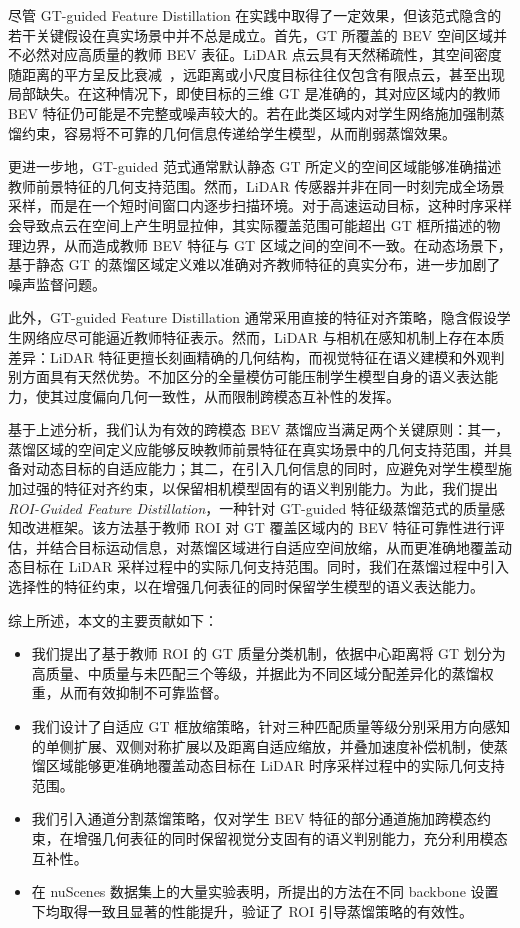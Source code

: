 \documentclass[12pt, UTF8]{ctexart}
\begin{document}
尽管 GT-guided Feature Distillation 在实践中取得了一定效果，但该范式隐含的若干关键假设在真实场景中并不总是成立。首先，GT 所覆盖的 BEV 空间区域并不必然对应高质量的教师 BEV 表征。LiDAR 点云具有天然稀疏性，其空间密度随距离的平方呈反比衰减~\cite{raanet,lidar_survey_2022}，远距离或小尺度目标往往仅包含有限点云，甚至出现局部缺失。在这种情况下，即使目标的三维 GT 是准确的，其对应区域内的教师 BEV 特征仍可能是不完整或噪声较大的。若在此类区域内对学生网络施加强制蒸馏约束，容易将不可靠的几何信息传递给学生模型，从而削弱蒸馏效果。

更进一步地，GT-guided 范式通常默认静态 GT 所定义的空间区域能够准确描述教师前景特征的几何支持范围。然而，LiDAR 传感器并非在同一时刻完成全场景采样，而是在一个短时间窗口内逐步扫描环境。对于高速运动目标，这种时序采样会导致点云在空间上产生明显拉伸，其实际覆盖范围可能超出 GT 框所描述的物理边界，从而造成教师 BEV 特征与 GT 区域之间的空间不一致。在动态场景下，基于静态 GT 的蒸馏区域定义难以准确对齐教师特征的真实分布，进一步加剧了噪声监督问题。

此外，GT-guided Feature Distillation 通常采用直接的特征对齐策略，隐含假设学生网络应尽可能逼近教师特征表示。然而，LiDAR 与相机在感知机制上存在本质差异：LiDAR 特征更擅长刻画精确的几何结构，而视觉特征在语义建模和外观判别方面具有天然优势。不加区分的全量模仿可能压制学生模型自身的语义表达能力，使其过度偏向几何一致性，从而限制跨模态互补性的发挥。

基于上述分析，我们认为有效的跨模态 BEV 蒸馏应当满足两个关键原则：其一，蒸馏区域的空间定义应能够反映教师前景特征在真实场景中的几何支持范围，并具备对动态目标的自适应能力；其二，在引入几何信息的同时，应避免对学生模型施加过强的特征对齐约束，以保留相机模型固有的语义判别能力。为此，我们提出 \emph{ROI-Guided Feature Distillation}，一种针对 GT-guided 特征级蒸馏范式的质量感知改进框架。该方法基于教师 ROI 对 GT 覆盖区域内的 BEV 特征可靠性进行评估，并结合目标运动信息，对蒸馏区域进行自适应空间放缩，从而更准确地覆盖动态目标在 LiDAR 采样过程中的实际几何支持范围。同时，我们在蒸馏过程中引入选择性的特征约束，以在增强几何表征的同时保留学生模型的语义表达能力。

综上所述，本文的主要贡献如下：
\begin{itemize}
    \item 我们提出了基于教师 ROI 的 GT 质量分类机制，依据中心距离将 GT 划分为高质量、中质量与未匹配三个等级，并据此为不同区域分配差异化的蒸馏权重，从而有效抑制不可靠监督。
    \item 我们设计了自适应 GT 框放缩策略，针对三种匹配质量等级分别采用方向感知的单侧扩展、双侧对称扩展以及距离自适应缩放，并叠加速度补偿机制，使蒸馏区域能够更准确地覆盖动态目标在 LiDAR 时序采样过程中的实际几何支持范围。
    \item 我们引入通道分割蒸馏策略，仅对学生 BEV 特征的部分通道施加跨模态约束，在增强几何表征的同时保留视觉分支固有的语义判别能力，充分利用模态互补性。
    \item 在 nuScenes 数据集上的大量实验表明，所提出的方法在不同 backbone 设置下均取得一致且显著的性能提升，验证了 ROI 引导蒸馏策略的有效性。
\end{itemize}
\end{document}
